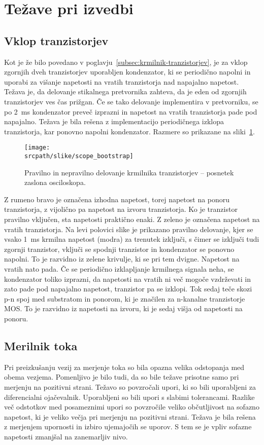 \documentclass[a4paper,twoside,openright,12pt,slovene]{book}
\newcommand{\srcpath}{res_dark}
\newcommand{\srcpath}{res}
\begin{document}
\section{Težave pri izvedbi} \label{sec:tezave-pri-izvedbi}
\subsection{Vklop tranzistorjev} \label{subsec:vklop-tranzistorjev}
Kot je že bilo povedano v poglavju~\ref{subsec:krmilnik-tranzistorjev}, je za vklop zgornjih dveh tranzistorjev uporabljen kondenzator,
ki se periodično napolni in uporabi za višanje napetosti na vratih tranzistorja nad napajalno napetost.
Težava je, da delovanje stikalnega pretvornika zahteva, da je eden od zgornjih tranzistorjev ves čas prižgan.
Če se tako delovanje implementira v pretvorniku, se po 2~ms kondenzator preveč izprazni in napetost na vratih tranzistorja pade pod napajalno.
Težava je bila rešena z implementacijo periodičnega izklopa tranzistorja, kar ponovno napolni kondenzator.
Razmere so prikazane na sliki~\ref{fig:posnetek-zaslona-osciloskopa}.
\begin{figure}[H]
       \centering
       \texttt{[image: \\srcpath/slike/scope\_bootstrap]}
       \caption{\label{fig:posnetek-zaslona-osciloskopa} Pravilno in nepravilno delovanje krmilnika tranzistorjev -- posnetek zaslona osciloskopa.}
\end{figure}

Z rumeno bravo je označena izhodna napetost, torej napetost na ponoru tranzistorja, z vijolično pa napetost na izvoru tranzistorja.
Ko je tranzistor pravilno vključen, sta napetosti praktično enaki.
Z zeleno je označena napetost na vratih tranzistorja.
Na levi polovici slike je prikazano pravilno delovanje, kjer se vsako 1~ms krmilna napetost (modra) za trenutek izključi,
s čimer se izključi tudi zgornji tranzistor, vključi se spodnji tranzistor in kondenzator se ponovno napolni.
To je razvidno iz zelene krivulje, ki se pri tem dvigne.
Napetost na vratih nato pada.
Če se periodično izklapljanje krmilnega signala neha, se kondenzator toliko izprazni, da napetosti na vratih ni več mogoče vzdrževati in zato pade pod napajalno napetost, tranzistor pa se izklopi.
Tok sedaj teče skozi p-n spoj med substratom in ponorom, ki je značilen za n-kanalne tranzistorje MOS. To je razvidno iz napetosti na izvoru, ki je sedaj višja od napetosti na ponoru.

\subsection{Merilnik toka} \label{subsec:merilnik-toka}
Pri preizkušanju vezij za merjenje toka so bila opazna velika odstopanja med obema vezjema.
Pomenljivo je bilo tudi, da so bile težave prisotne samo pri merjenju na pozitivni strani.
Težavo so povzročali upori, ki so bili uporabljeni za diferencialni ojačevalnik.
Uporabljeni so bili upori s slabimi tolerancami.
Razlike več odstotkov med posameznimi upori so povzročile veliko občutljivost na sofazno napetost, ki je veliko večja pri merjenju na pozitivni strani.
Težava je bila rešena z merjenjem upornosti in izbiro ujemajočih se uporov.
S tem se je vpliv sofazne napetosti zmanjšal na zanemarljiv nivo.
\end{document}
